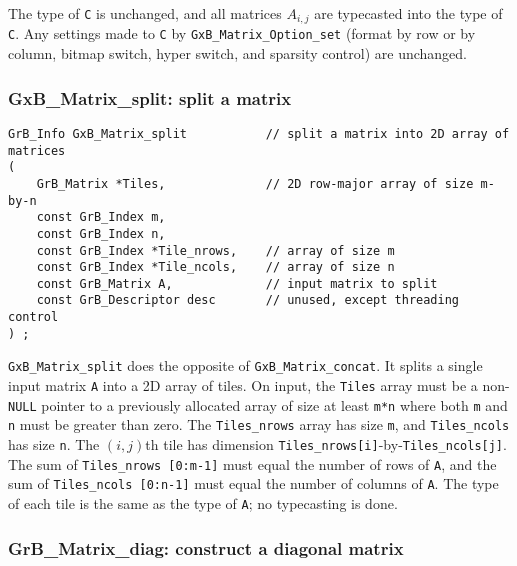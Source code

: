 \documentclass[12pt]{article}
\begin{document}
The type of \verb'C' is unchanged, and all matrices $A_{i,j}$ are typecasted
into the type of \verb'C'.  Any settings made to \verb'C' by
\verb'GxB_Matrix_Option_set' (format by row or by column, bitmap switch, hyper
switch, and sparsity control) are unchanged.

\subsubsection{{\sf GxB\_Matrix\_split:} split a matrix   }
\label{matrix_split}

\begin{mdframed}[userdefinedwidth=6in]
{\footnotesize
\begin{verbatim}
GrB_Info GxB_Matrix_split           // split a matrix into 2D array of matrices
(
    GrB_Matrix *Tiles,              // 2D row-major array of size m-by-n
    const GrB_Index m,
    const GrB_Index n,
    const GrB_Index *Tile_nrows,    // array of size m
    const GrB_Index *Tile_ncols,    // array of size n
    const GrB_Matrix A,             // input matrix to split
    const GrB_Descriptor desc       // unused, except threading control
) ;
\end{verbatim} } \end{mdframed}

\verb'GxB_Matrix_split' does the opposite of \verb'GxB_Matrix_concat'.  It
splits a single input matrix \verb'A' into a 2D array of tiles.  On input, the
\verb'Tiles' array must be a non-\verb'NULL' pointer to a previously allocated
array of size at least \verb'm*n' where both \verb'm' and \verb'n' must be
greater than zero.  The \verb'Tiles_nrows' array has size \verb'm', and
\verb'Tiles_ncols' has size \verb'n'.  The $(i,j)$th tile has dimension
\verb'Tiles_nrows[i]'-by-\verb'Tiles_ncols[j]'.  The sum of
\verb'Tiles_nrows [0:m-1]' must equal the number of rows of \verb'A', and the
sum of \verb'Tiles_ncols [0:n-1]' must equal the number of columns of \verb'A'.
The type of each tile is the same as the type of \verb'A'; no typecasting is
done.

\newpage
\subsubsection{{\sf GrB\_Matrix\_diag:} construct a diagonal matrix}
\label{matrix_diag}
\end{document}
